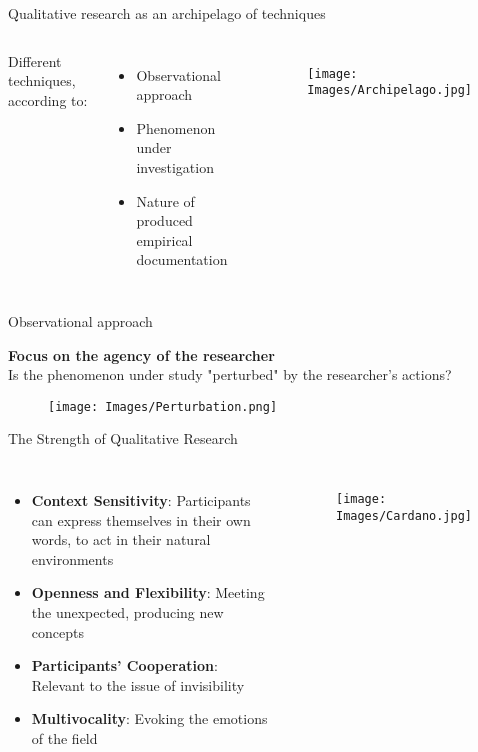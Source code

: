 \documentclass[10pt, aspectratio=169]{beamer}
\begin{document}
\begin{frame}{Qualitative research as an archipelago of techniques}
\begin{columns}[T]
Different techniques, according to: \vspace{0.3cm}
\begin{itemize}
    \item Observational approach\vspace{0.3cm}
    \item Phenomenon under investigation\vspace{0.3cm}
    \item Nature of produced empirical documentation
\end{itemize}
\begin{figure}
    \centering
    \texttt{[image: Images/Archipelago.jpg]}
    \label{fig:archipelago}
\end{figure}
\end{columns}
\end{frame}

\begin{frame}{Observational approach}
\begin{center}
\textbf{Focus on the agency of the researcher} \\
Is the phenomenon under study "perturbed" by the researcher's actions? 
\end{center}
\begin{figure}
    \centering
    \texttt{[image: Images/Perturbation.png]}
    \label{fig:enter-label}
\end{figure}
\end{frame}


\begin{frame}{The Strength of Qualitative Research}
\begin{columns}
\begin{itemize}
    \item \textbf{Context Sensitivity}: Participants can express themselves in their own words, to act in their natural environments\vspace{0.3cm}
    \item \textbf{Openness and Flexibility}: Meeting the unexpected, producing new concepts\vspace{0.3cm}
    \item \textbf{Participants' Cooperation}: Relevant to the issue of invisibility\vspace{0.3cm}
    \item \textbf{Multivocality}: Evoking the emotions of the field
\end{itemize}
\begin{figure}
    \centering
    \texttt{[image: Images/Cardano.jpg]}
    \label{fig:qualitative-strength}
\end{figure}
\end{columns}
\end{frame}
\end{document}
